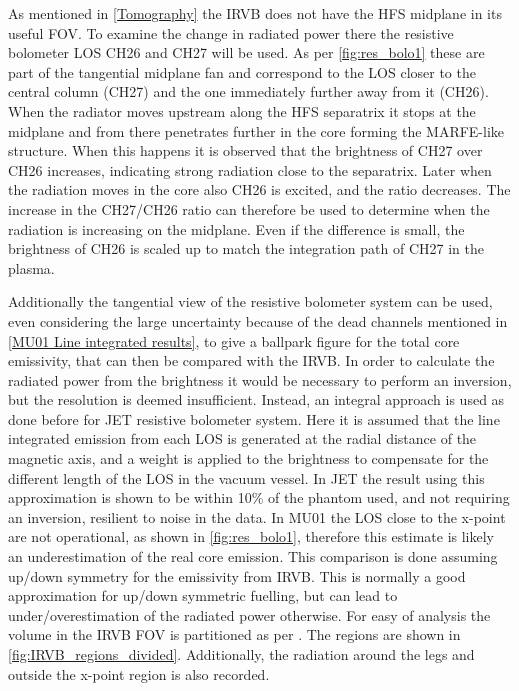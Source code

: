As mentioned in \autoref{Tomography} the IRVB does not have the HFS midplane in its useful FOV. To examine the change in radiated power there the resistive bolometer LOS CH26 and CH27 will be used. As per \autoref{fig:res_bolo1} these are part of the tangential midplane fan and correspond to the LOS closer to the central column (CH27) and the one immediately further away from it (CH26). When the radiator moves upstream along the HFS separatrix it stops at the midplane and from there penetrates further in the core forming the MARFE-like structure. When this happens it is observed that the brightness of CH27 over CH26 increases, indicating strong radiation close to the separatrix. Later when the radiation moves in the core also CH26 is excited, and the ratio decreases. The increase in the CH27/CH26 ratio can therefore be used to determine when the radiation is increasing on the midplane. Even if the difference is small, the brightness of CH26 is scaled up to match the integration path of CH27 in the plasma.

Additionally the tangential view of the resistive bolometer system can be used, even considering the large uncertainty because of the dead channels mentioned in \autoref{MU01 Line integrated results}, to give a ballpark figure for the total core emissivity, that can then be compared with the IRVB. In order to calculate the radiated power from the brightness it would be necessary to perform an inversion, but the resolution is deemed insufficient. Instead, an integral approach is used as done before for JET resistive bolometer system.\cite{Ingesson2000} Here it is assumed that the line integrated emission from each LOS is generated at the radial distance of the magnetic axis, and a weight is applied to the brightness to compensate for the different length of the LOS in the vacuum vessel. In JET the result using this approximation is shown to be within 10\% of the phantom used, and not requiring an inversion, resilient to noise in the data. In MU01 the LOS close to the x-point are not operational, as shown in \autoref{fig:res_bolo1}, therefore this estimate is likely an underestimation of the real core emission. This comparison is done assuming up/down symmetry for the emissivity from IRVB. This is normally a good approximation for up/down symmetric fuelling, but can lead to under/overestimation of the radiated power otherwise.
For easy of analysis the volume in the IRVB FOV is partitioned as per \cite{Harrison2017}. The regions are shown in \autoref{fig:IRVB_regions_divided}. Additionally, the radiation around the legs and outside the x-point region is also recorded.

